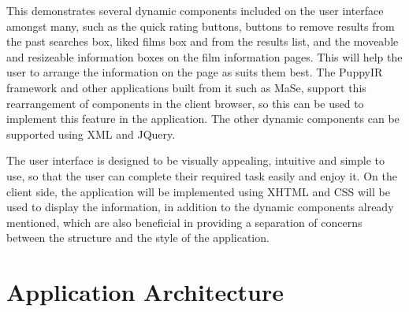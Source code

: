 \documentclass{sig-alt-release2}
\begin{document}
This demonstrates several dynamic components included on the user interface amongst many, such as the quick rating buttons, buttons to remove results from the past searches box, liked films box and from the results list, and the moveable and resizeable information boxes on the film information pages. This will help the user to arrange the information on the page as suits them best. The PuppyIR framework and other applications built from it such as MaSe, support this rearrangement of components in the client browser, so this can be used to implement this feature in the application. The other dynamic components can be supported using XML and JQuery.
 
The user interface is designed to be visually appealing, intuitive and simple to use, so that the user can complete their required task easily and enjoy it. On the client side, the application will be implemented using XHTML and CSS will be used to display the information, in addition to the dynamic components already mentioned, which are also beneficial in providing a separation of concerns between the structure and the style of the application.

\newpage
\section{Application Architecture}
\end{document}
